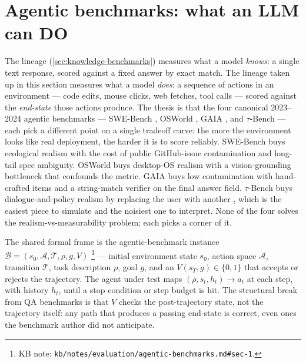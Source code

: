 
\section{Agentic benchmarks: what an LLM can DO}
\label{sec:agentic-benchmarks}

The  lineage (\cref{sec:knowledge-benchmarks}) measures what a model
\emph{knows}: a single text response, scored against a fixed answer 
by exact match. The lineage taken up in this section measures what a
model \emph{does}: a sequence of actions in an environment --- code
edits, mouse clicks, web fetches, tool calls --- scored against the
\emph{end-state} those actions produce. The thesis is that the four
canonical 2023--2024 agentic benchmarks --- SWE-Bench
\citep{jimenez2024-swebench}, OSWorld \citep{xie2024-osworld}, GAIA
\citep{mialon2023-gaia}, and $\tau$-Bench \citep{yao2024-tau-bench}
--- each pick a different point on a single tradeoff curve: the more
the environment looks like real deployment, the harder it is to score
reliably. SWE-Bench buys ecological realism with the cost of public
GitHub-issue contamination and long-tail spec ambiguity. OSWorld buys
desktop-OS realism with a vision-grounding bottleneck that confounds
the metric. GAIA buys low contamination with hand-crafted items and
a string-match verifier on the final answer field. $\tau$-Bench buys
dialogue-and-policy realism by replacing the user with another ,
which is the easiest piece to simulate and the noisiest one to
interpret. None of the four solves the realism-vs-measurability
problem; each picks a corner of it.

The shared formal frame is the agentic-benchmark instance
$\mathcal{B} = (s_0, \mathcal{A}, \mathcal{T}, \rho, g, V)$%
\footnote{KB note: \texttt{kb/notes/evaluation/agentic-benchmarks.md\#sec-1}.}
--- initial environment state $s_0$, action space $\mathcal{A}$,
transition $\mathcal{T}$, task description $\rho$, goal $g$, and an
 $V(s_T, g) \in \{0, 1\}$ that accepts or rejects
the trajectory. The agent under test maps $(\rho, s_t, h_t) \to a_t$
at each step, with history $h_t$, until a stop condition or step
budget is hit. The structural break from QA benchmarks is that $V$
checks the post-trajectory state, not the trajectory itself: any path
that produces a passing end-state is correct, even ones the
benchmark author did not anticipate.

